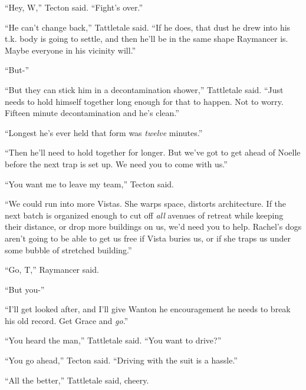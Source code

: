 ``Hey, W,'' Tecton said.  ``Fight's over.''



``He can't change back,'' Tattletale said.  ``If he does, that dust he drew into his t.k. body is going to settle, and then he'll be in the same shape Raymancer is.  Maybe everyone in his vicinity will.''



``But-''



``But they can stick him in a decontamination shower,'' Tattletale said.  ``Just needs to hold himself together long enough for that to happen.  Not to worry.  Fifteen minute decontamination and he's clean.''



``Longest he's ever held that form was \emph{twelve} minutes.''



``Then he'll need to hold together for longer.  But we've got to get ahead of Noelle before the next trap is set up.  We need you to come with us.''



``You want me to leave my team,'' Tecton said.



``We could run into more Vistas.  She warps space, distorts architecture.  If the next batch is organized enough to cut off \emph{all} avenues of retreat while keeping their distance, or drop more buildings on us, we'd need you to help.  Rachel's dogs aren't going to be able to get us free if Vista buries us, or if she traps us under some bubble of stretched building.''



``Go, T,'' Raymancer said.



``But you-''



``I'll get looked after, and I'll give Wanton he encouragement he needs to break his old record.  Get Grace and \emph{go}.''



``You heard the man,'' Tattletale said.  ``You want to drive?''



``You go ahead,'' Tecton said.  ``Driving with the suit is a hassle.''



``All the better,'' Tattletale said, cheery.



